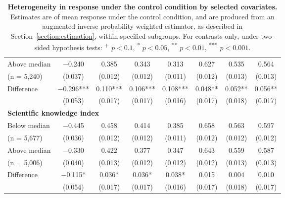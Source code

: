 \documentclass[letterpaper, 12pt, parskip=full,DIV=10]{scrartcl}
\begin{document}
\begin{table}[H]
{\begin{tabular}{lccccccc}
\hspace{1em} Above median  & \num{-0.240} & \num{0.385} & \num{0.343} & \num{0.313} & \num{0.627} & \num{0.535} & \num{0.564}\\
\hspace{1.5em}  (n = 5,240) & (\num{0.037}) & (\num{0.012}) & (\num{0.012}) & (\num{0.011}) & (\num{0.012}) & (\num{0.013}) & (\num{0.013})\\
\cmidrule(lr){2-8}
\hspace{1em} Difference & \num{-0.296}*** & \num{0.110}*** & \num{0.106}*** & \num{0.108}*** & \num{0.048}** & \num{0.052}** & \num{0.056}**\\
 & (\num{0.053}) & (\num{0.017}) & (\num{0.017}) & (\num{0.016}) & (\num{0.017}) & (\num{0.018}) & (\num{0.017})\\
\multicolumn{4}{l}{\textbf{Scientific knowledge index}} \rule{0pt}{1.2\normalbaselineskip} \\
\hspace{1em} Below median & \num{-0.445} & \num{0.458} & \num{0.414} & \num{0.385} & \num{0.658} & \num{0.563} & \num{0.597}\\
\hspace{1.5em}   (n = 5,677) & (\num{0.036}) & (\num{0.012}) & (\num{0.012}) & (\num{0.011}) & (\num{0.012}) & (\num{0.012}) & (\num{0.012})\\
\hspace{1em} Above median & \num{-0.330} & \num{0.422} & \num{0.377} & \num{0.347} & \num{0.643} & \num{0.559} & \num{0.587}\\
\hspace{1.5em}  (n = 5,006)  & (\num{0.040}) & (\num{0.013}) & (\num{0.012}) & (\num{0.012}) & (\num{0.012}) & (\num{0.013}) & (\num{0.013})\\
\cmidrule(lr){2-8}
\hspace{1em} Difference  & \num{-0.115}* & \num{0.036}* & \num{0.036}* & \num{0.038}* & \num{0.015} & \num{0.004} & \num{0.010}\\
 & (\num{0.054}) & (\num{0.017}) & (\num{0.017}) & (\num{0.016}) & (\num{0.017}) & (\num{0.018}) & (\num{0.017})\\
   \end{tabular}}
   \caption{\textbf{Heterogeneity in response under the control condition by selected covariates.} Estimates are of mean response under the control condition, and are produced from an augmented inverse probability weighted estimator, as described in Section~\ref{section:estimation}, within specified subgroups. For contrasts only, under two-sided hypothesis tests: \textsuperscript{+} $p<0.1$, \textsuperscript{*} $p < 0.05$, \textsuperscript{**} $p < 0.01$, \textsuperscript{***} $p < 0.001$.}
\label{tab:heterogeneity_control}
\end{table}
\end{document}
